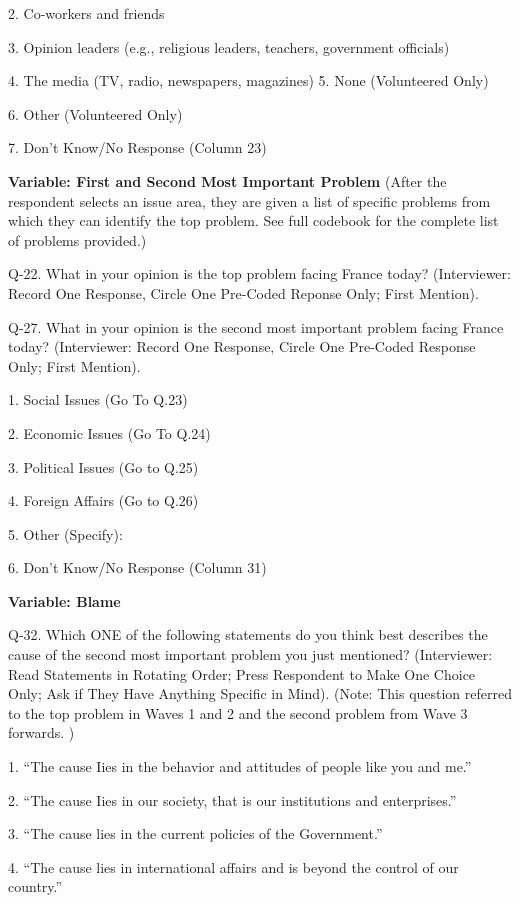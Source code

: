 \documentclass[12pt]{report}
\begin{document}
2. Co-workers and friends

3. Opinion leaders (e.g., religious leaders, teachers, government
officials)

4. The media (TV, radio, newspapers, magazines) 5. None (Volunteered
Only)

6. Other (Volunteered Only)

7. Don\textquoteright{}t Know/No Response (Column 23)

\noindent \textbf{Variable: First and Second Most Important Problem}
(After the respondent selects an issue area, they are given a list
of specific problems from which they can identify the top problem.
See full codebook for the complete list of problems provided.)

\noindent Q-22. What in your opinion is the top problem facing France
today? (Interviewer: Record One Response, Circle One Pre-Coded Reponse
Only; First Mention).

\noindent Q-27. What in your opinion is the second most important
problem facing France today? (Interviewer: Record One Response, Circle
One Pre-Coded Response Only; First Mention).

1. Social Issues (Go To Q.23)

2. Economic Issues (Go To Q.24)

3. Political Issues (Go to Q.25)

4. Foreign Affairs (Go to Q.26)

5. Other (Specify):

6. Don\textquoteright{}t Know/No Response (Column 31)


\noindent \textbf{Variable: Blame}

\noindent Q-32. Which ONE of the following statements do you think best describes
the cause of the second most important problem you just mentioned?
(Interviewer: Read Statements in Rotating Order; Press Respondent
to Make One Choice Only; Ask if They Have Anything Specific in Mind).
(Note: This question referred to the top problem in Waves 1 and 2
and the second problem from Wave 3 forwards. )

1. ``The cause Iies in the behavior and attitudes of people like
you and me.''

2. ``The cause Iies in our society, that is our institutions and
enterprises.''

3. ``The cause lies in the current policies of the Government.''

4. ``The cause lies in international affairs and is beyond the control
of our country.''
\end{document}
